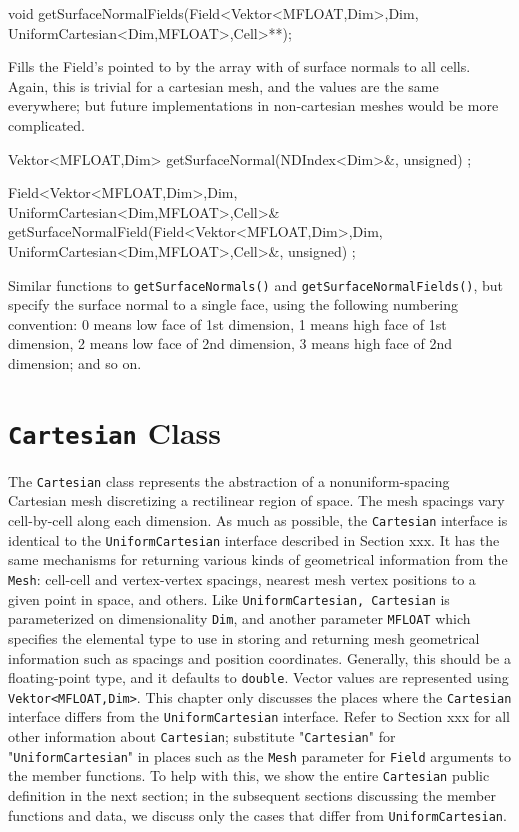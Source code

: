\begin{smallcode}
void getSurfaceNormalFields(Field<Vektor<MFLOAT,Dim>,Dim, UniformCartesian<Dim,MFLOAT>,Cell>**);
\end{smallcode}
Fills the Field's pointed to by the array with of surface normals to all cells. Again, this is trivial for a cartesian mesh, and the values are the same everywhere; but future implementations in non-cartesian meshes would be more complicated. 

\begin{smallcode}
Vektor<MFLOAT,Dim> getSurfaceNormal(NDIndex<Dim>&, unsigned) ;

Field<Vektor<MFLOAT,Dim>,Dim, UniformCartesian<Dim,MFLOAT>,Cell>& 
getSurfaceNormalField(Field<Vektor<MFLOAT,Dim>,Dim, 
	UniformCartesian<Dim,MFLOAT>,Cell>&, unsigned) ;
\end{smallcode}
Similar functions to \texttt{getSurfaceNormals()} and \texttt{getSurfaceNormalFields()}, but specify the surface normal to a single face, using the following numbering convention: 
0 means low face of 1st dimension, 1 means high face of 1st dimension, 2 means low face of 2nd dimension, 3 means high face of 2nd dimension; and so on. 

\section{\texttt{Cartesian} Class}
\label{app:cartclass} 
The \texttt{Cartesian} class represents the abstraction of a nonuniform-spacing Cartesian mesh discretizing a rectilinear region of space. The mesh spacings vary cell-by-cell along each dimension. As much as possible, the 
\texttt{Cartesian} interface is identical to the \texttt{UniformCartesian} interface described in Section xxx. It has the same mechanisms for returning various kinds of geometrical information from the \texttt{Mesh}: 
cell-cell and vertex-vertex spacings, nearest mesh vertex positions to a given point in space, and others. 
Like \texttt{UniformCartesian, Cartesian} is parameterized on dimensionality \texttt{Dim}, and another parameter \texttt{MFLOAT} which specifies the elemental type to use in storing and returning mesh geometrical 
information such as spacings and position coordinates. Generally, this should be a floating-point type, and it defaults to \texttt{double}. Vector values are represented using \texttt{Vektor<MFLOAT,Dim>}. 
This chapter only discusses the places where the \texttt{Cartesian} interface differs from the \texttt{UniformCartesian} interface. Refer to Section xxx for all other information about \texttt{Cartesian}; substitute "\texttt{Cartesian}" for "\texttt{UniformCartesian}" in places such as the \texttt{Mesh} parameter for \texttt{Field} arguments to the member functions. To help with this, we show the entire \texttt{Cartesian} public definition in the next section; 
in the subsequent sections discussing the member functions and data, we discuss only the cases that differ from \texttt{UniformCartesian}. 

